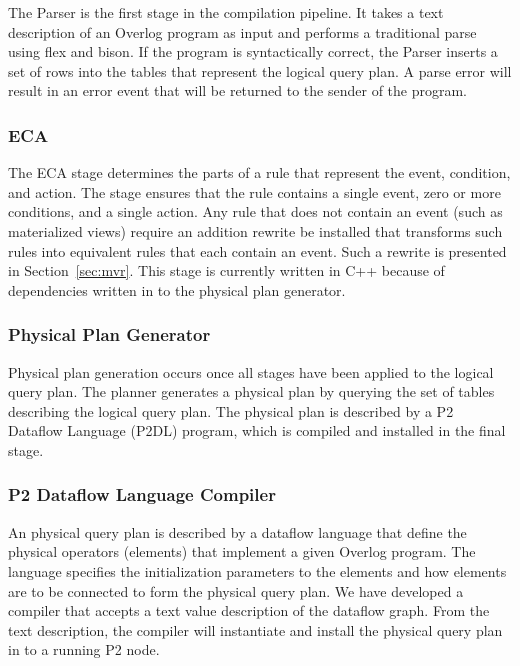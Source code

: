 \documentclass{vldb}
\begin{document}
The Parser is the first stage in the compilation pipeline. It takes a text
description of an Overlog program as input and performs a traditional
parse using flex and bison. If the program is syntactically correct, the Parser
inserts a set of rows into the tables that represent the logical query plan. A parse
error will result in an error event that will be returned to the sender of the program. 

\subsubsection{ECA}

The ECA stage determines the parts of a rule that represent the event, condition,
and action. The stage ensures that the rule contains a single event, zero or more
conditions, and a single action. Any rule that does not contain an event (such as
materialized views) require an addition rewrite be installed that transforms such rules 
into equivalent rules that each contain an event. Such a rewrite is presented in 
Section~\ref{sec:mvr}.  This stage is currently written in C++ because of 
dependencies written in to the physical plan generator.

\subsubsection{Physical Plan Generator}

Physical plan generation occurs once all stages have been applied to the
logical query plan. The planner generates a physical plan by querying the
set of tables describing the logical query plan. The physical plan is described
by a P2 Dataflow Language (P2DL) program, which is compiled and installed
in the final stage. 


\subsubsection{P2 Dataflow Language Compiler}

An physical query plan is described by a dataflow language that define
the physical operators (elements) that implement a given Overlog program.
The language specifies the initialization parameters to the elements and
how elements are to be connected to form the physical query plan. We have
developed a compiler that accepts a text value description of the dataflow
graph. From the text description, the compiler will instantiate and install 
the physical query plan in to a running P2 node. 
\end{document}
